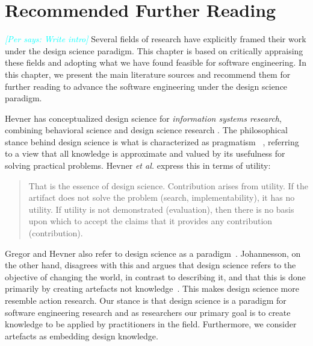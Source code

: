\documentclass[graybox]{svmult}
\newcommand{\emelie}[1]{\textcolor{red}{{\it [Emelie says: #1]}}}
\newcommand{\per}[1]{\textcolor{cyan}{{\it [Per says: #1]}}}
\newcommand{\emelie}[1]{}
\newcommand{\per}[1]{}
\begin{document}
\section{Recommended Further Reading}
\label{sec:reading}
\per{Write intro}
Several fields of research have explicitly framed their work under the design science paradigm. This chapter is based on critically appraising these fields and adopting what we have found feasible for software engineering. In this chapter, we present the main literature sources and recommend them for further reading to advance the software engineering under the design science paradigm.

Hevner has conceptualized design science for \emph{information systems research}, combining behavioral science and design science research \cite{hevner_design_2004,hevner_design_2010}.
The philosophical stance behind design science is what is characterized as pragmatism~\cite{easterbrook_selecting_2008}%
, referring to a view that all knowledge is approximate and valued by its usefulness for solving practical problems. Hevner \emph{et al.} express this in terms of utility: 

\begin{quote}
	That is the essence of design science. Contribution arises from utility. If the artifact does not solve the problem (search, implementability), it has no utility. If utility is not demonstrated (evaluation), then there is no basis upon which to accept the claims that it provides any contribution (contribution).~\cite[p. 91]{hevner_design_2004}
\end{quote}


Gregor and Hevner also refer to design science as a paradigm~\cite{gregor_positioning_2013}. Johannesson, on the other hand, disagrees with this and argues that design science refers to the objective of changing the world, in contrast to describing it, and that this is done primarily by creating artefacts not knowledge~\cite{johannesson_introduction_2014}. This makes design science more resemble action research. Our stance is that design science is a paradigm for software engineering research and as researchers our primary goal is to create knowledge to be applied by practitioners in the field. Furthermore, we consider artefacts as embedding design knowledge. 
\end{document}

